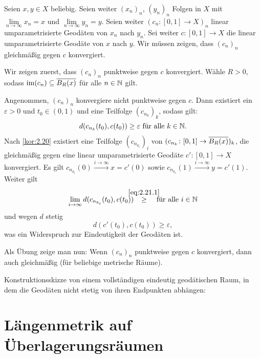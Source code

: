 \begin{beweis}
	Seien $x,y \in X$ beliebig.
	Seien weiter $(x_n)_n$, $(y_n)_n$ Folgen in $X$ mit $\lim\limits_{n \rightarrow \infty} x_n = x$ und $\lim\limits_{n \rightarrow \infty} y_n = y$.
	Seien weiter $(c_n\colon [0,1] \rightarrow X)_n$ linear umparametrisierte Geodäten von $x_n$ nach $y_n$.
	Sei weiter $c \colon [0,1] \rightarrow X$ die linear umparametrisierte Geodäte von $x$ nach $y$.
	Wir müssen zeigen, dass $(c_n)_n$ gleichmäßig gegen $c$ konvergiert.
	
	Wir zeigen zuerst, dass $(c_n)_n$ punktweise gegen $c$ konvergiert.
	Wähle $R > 0$, sodass $\operatorname{im}(c_n) \subseteq \overline{B_R(x)}$ für alle $n \in \mathbb{N}$ gilt.
	
	Angenommen, $(c_n)_n$ konvergiere nicht punktweise gegen $c$.
	Dann existiert ein $\varepsilon > 0$ und $t_0 \in (0,1)$ und eine Teilfolge $(c_{n_k})_k$, sodass gilt:
	\begin{equation}
		d(c_{n_k}(t_0),c(t_0)) \geq \varepsilon \text{ für alle } k \in \mathbb{N}. \label{eq:2.21.1}
	\end{equation}
	Nach \autoref{kor:2.20} existiert eine Teilfolge $(c_{n_{k_i}})_i$ von $(c_{n_k}\colon [0,1] \rightarrow \overline{B_R(x)})_k$, die gleichmäßig gegen eine linear umparametrisierte Geodäte $c'\colon [0,1] \rightarrow X$ konvergiert.
	Es gilt $c_{n_{k_i}}(0) \xrightarrow{i \rightarrow \infty} x = c'(0)$ sowie $c_{n_{k_i}}(1) \xrightarrow{i \rightarrow \infty} y = c'(1)$. Weiter gilt
	\[
		\lim\limits_{i \rightarrow \infty} d(c_{n_{k_i}}(t_0),c(t_0)) \stack{\eqref{eq:2.21.1}}{\geq} \text{ für alle } i \in \NN
	\]
	und wegen $d$ stetig
	\[
		d(c'(t_0),c(t_0)) \geq \varepsilon,
	\]
	was ein Widerspruch zur Eindeutigkeit der Geodäten ist.
	
	Als Übung zeige man nun: Wenn $(c_n)_n$ punktweise gegen $c$ konvergiert, dann auch gleichmäßig (für beliebige metrische Räume). \qedhere
\end{beweis}


\begin{bemerkung}
\label{bem:2.22}
	Konstruktionsskizze von einem vollständigen eindeutig geodätischen Raum, in dem die Geodäten nicht stetig von ihren Endpunkten abhängen: 
\end{bemerkung}

\section{Längenmetrik auf Überlagerungsräumen}
\label{sec:2.2}

